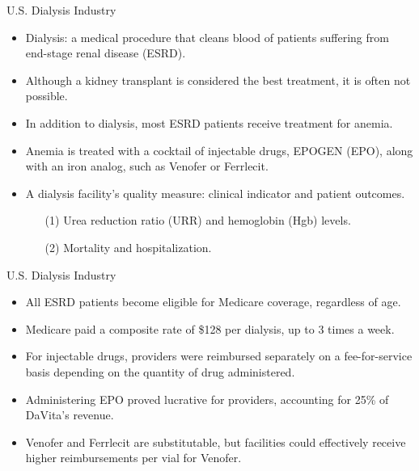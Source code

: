 \documentclass[aspectratio=169]{beamer}
\begin{document}
\begin{frame}{U.S. Dialysis Industry}

\begin{itemize}
\item Dialysis: a medical procedure that cleans blood of patients suffering from end-stage renal disease (ESRD).
\item Although a kidney transplant is considered the best treatment, it is often not possible.
\item In addition to dialysis, most ESRD patients receive treatment for anemia.
\item Anemia is treated with a cocktail of injectable drugs, EPOGEN (EPO), along with an iron analog, such as Venofer or Ferrlecit.
\item A dialysis facility's quality measure: clinical indicator and patient outcomes.
    \begin{itemize}
        \item [(1)] Urea reduction ratio (URR) and hemoglobin (Hgb) levels.
        \item [(2)] Mortality and hospitalization.
    \end{itemize}

\end{itemize}

\end{frame}

\begin{frame}{U.S. Dialysis Industry}

\begin{itemize}
\item All ESRD patients become eligible for Medicare coverage, regardless of age.
\item Medicare paid a composite rate of \$128 per dialysis, up to 3 times a week.
\item For injectable drugs, providers were reimbursed separately on a fee-for-service basis depending on the quantity of drug administered.
\item Administering EPO proved lucrative for providers, accounting for 25\% of DaVita's revenue.
\item Venofer and Ferrlecit are substitutable, but facilities could effectively receive higher reimbursements per vial for Venofer.


\end{itemize}

\end{frame}
\end{document}
